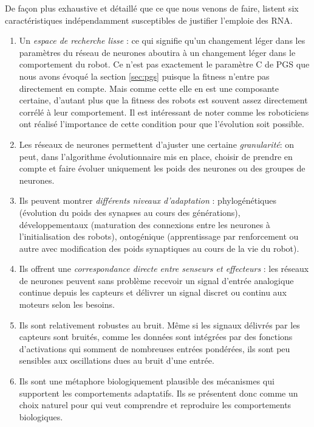 De façon plus exhaustive et détaillé que ce que nous venons de faire, \citet[p. 39]{nolfi00evolrobobiolintetechselfmach} listent six caractéristiques indépendamment susceptibles de justifier l'emploie des RNA.
\begin{enumerate}
   \item Un \emph{espace de recherche lisse} : ce qui signifie qu'un changement léger dans les paramètres du réseau de neurones aboutira à un changement léger dans le comportement du robot. Ce n'est pas exactement le paramètre C de PGS que nous avons évoqué la section \ref{sec:pgs} puisque la fitness n'entre pas directement en compte. Mais comme cette elle en est une composante certaine, d'autant plus que la fitness des robots est souvent assez directement corrélé à leur comportement. Il est intéressant de noter comme les roboticiens ont réalisé l'importance de cette condition pour que l'évolution soit possible.
   \item Les réseaux de neurones permettent d'ajuster une certaine \emph{granularité}: on peut, dans l'algorithme évolutionnaire mis en place, choisir de prendre en compte et faire évoluer uniquement les poids des neurones ou des groupes de neurones.
   \item Ils peuvent montrer \emph{différents niveaux d'adaptation} : phylogénétiques (évolution du poids des synapses au cours des générations), développementaux (maturation des connexions entre les neurones à l'initialisation des robots), ontogénique (apprentissage par renforcement ou autre avec modification des poids synaptiques au cours de la vie du robot).
   \item Ils offrent une \emph{correspondance directe entre senseurs et effecteurs} : les réseaux de neurones peuvent sans problème recevoir un signal d'entrée analogique continue depuis les capteurs et délivrer un signal discret ou continu aux moteurs selon les besoins.
   \item Ils sont relativement robustes au bruit. Même si les signaux délivrés par les capteurs sont bruités, comme les données sont intégrées par des fonctions d'activations qui somment de nombreuses entrées pondérées, ils sont peu sensibles aux oscillations dues au bruit d'une entrée.
   \item Ils sont une métaphore biologiquement plausible des mécanismes qui supportent les comportements adaptatifs. Ils se présentent donc comme un choix naturel pour qui veut comprendre et reproduire les comportements biologiques. \\
       \citep[Plus ou moins librement adapté de ][p. 39 les emphases ont toutes été ajoutées]{nolfi00evolrobobiolintetechselfmach}
\end{enumerate}
